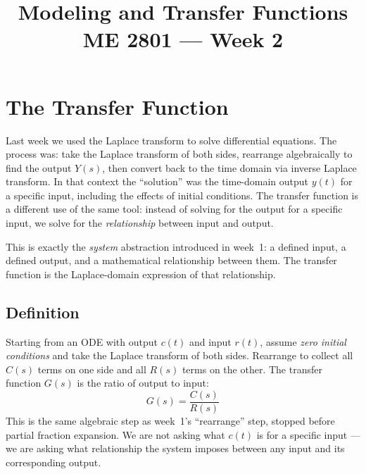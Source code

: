 \documentclass[12pt]{article}
\title{Modeling and Transfer Functions\\[0.5em]
\large ME 2801 --- Week 2}
\author{}
\date{}
\begin{document}
\maketitle
\tableofcontents
\newpage

\section{The Transfer Function}
\label{sec:tf}

Last week we used the Laplace transform to solve differential equations.  The
process was: take the Laplace transform of both sides, rearrange algebraically
to find the output $Y(s)$, then convert back to the time domain via inverse Laplace transform.  In that
context the ``solution'' was the time-domain output $y(t)$ for a specific input,
including the effects of initial conditions.  The transfer function is a
different use of the same tool: instead of solving for the output for a specific
input, we solve for the \emph{relationship} between input and output.

This is exactly the \emph{system} abstraction introduced in week~1: a defined
input, a defined output, and a mathematical relationship between them.  The
transfer function is the Laplace-domain expression of that relationship.

\subsection{Definition}
\label{sec:tf_def}

Starting from an ODE with output $c(t)$ and input $r(t)$, assume
\emph{zero initial conditions} and take the Laplace transform of both sides.
Rearrange to collect all $C(s)$ terms on one side and all $R(s)$ terms on
the other.  The transfer function $G(s)$ is the ratio of output to input:
\begin{equation}
  G(s) = \frac{C(s)}{R(s)}
  \label{eq:tf_def}
\end{equation}
This is the same algebraic step as week~1's ``rearrange'' step, stopped before
partial fraction expansion.  We are not asking what $c(t)$ is for a specific
input --- we are asking what relationship the system imposes between any input
and its corresponding output.
\end{document}

